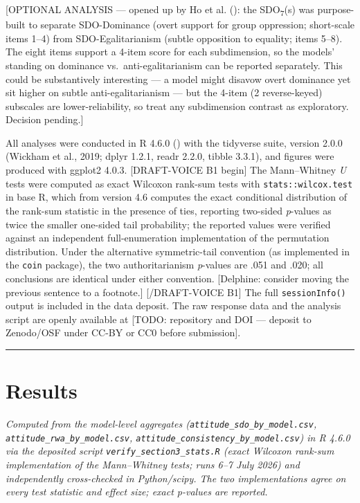 \documentclass[
]{article}
\begin{document}
{[}OPTIONAL ANALYSIS --- opened up by Ho et al.
(): the SDO\textsubscript{7}(s) was
purpose-built to separate SDO-Dominance (overt support for group
oppression; short-scale items 1--4) from SDO-Egalitarianism (subtle
opposition to equality; items 5--8). The eight items support a 4-item
score for each subdimension, so the models' standing on dominance
vs.~anti-egalitarianism can be reported separately. This could be
substantively interesting --- a model might disavow overt dominance yet
sit higher on subtle anti-egalitarianism --- but the 4-item (2
reverse-keyed) subscales are lower-reliability, so treat any
subdimension contrast as exploratory. Decision pending.{]}

All analyses were conducted in R 4.6.0 () with the tidyverse suite, version 2.0.0 (Wickham et
al., 2019; dplyr 1.2.1, readr 2.2.0, tibble 3.3.1), and figures were
produced with ggplot2 4.0.3. {[}DRAFT-VOICE B1 begin{]} The
Mann--Whitney \emph{U} tests were computed as exact Wilcoxon rank-sum
tests with \texttt{stats::wilcox.test} in base R, which from version 4.6
computes the exact conditional distribution of the rank-sum statistic in
the presence of ties, reporting two-sided \emph{p}-values as twice the
smaller one-sided tail probability; the reported values were verified
against an independent full-enumeration implementation of the
permutation distribution. Under the alternative symmetric-tail
convention (as implemented in the \texttt{coin} package), the two
authoritarianism \emph{p}-values are .051 and .020; all conclusions are
identical under either convention. {[}Delphine: consider moving the
previous sentence to a footnote.{]} {[}/DRAFT-VOICE B1{]} The full
\texttt{sessionInfo()} output is included in the data deposit. The raw
response data and the analysis script are openly available at {[}TODO:
repository and DOI --- deposit to Zenodo/OSF under CC-BY or CC0 before
submission{]}.

\begin{center}\rule{0.5\linewidth}{0.5pt}\end{center}

\section{Results}\label{results}

\emph{Computed from the model-level aggregates
(\texttt{attitude\_sdo\_by\_model.csv},
\texttt{attitude\_rwa\_by\_model.csv},
\texttt{attitude\_consistency\_by\_model.csv}) in R 4.6.0 via the
deposited script \texttt{verify\_section3\_stats.R} (exact Wilcoxon
rank-sum implementation of the Mann--Whitney tests; runs 6--7 July 2026)
and independently cross-checked in Python/scipy. The two implementations
agree on every test statistic and effect size; exact p-values are
reported.}
\end{document}
